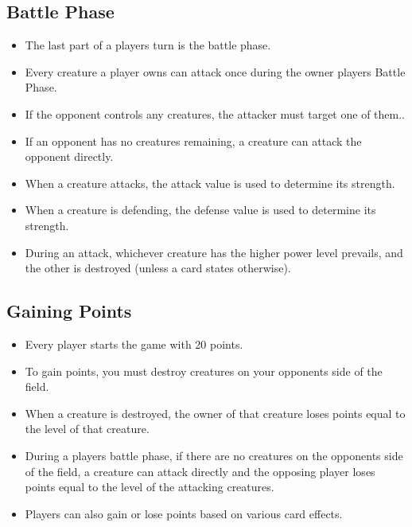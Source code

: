 \subsection{Battle Phase}
\begin{itemize}
    \item The last part of a players turn is the battle phase.
    \item Every creature a player owns can attack once during the owner players Battle Phase.
    \item If the opponent controls any creatures, the attacker must target one of them..
    \item If an opponent has no creatures remaining, a creature can attack the opponent directly.
    \item When a creature attacks, the attack value is used to determine its strength.
    \item When a creature is defending, the defense value is used to determine its strength.
    \item During an attack, whichever creature has the higher power level prevails, and the other is destroyed (unless a card states otherwise).
\end{itemize}








\subsection{Gaining Points}
\begin{itemize}
    \item Every player starts the game with 20 points.
    \item To gain points, you must destroy creatures on your opponents side of the field.
    \item When a creature is destroyed, the owner of that creature loses points equal to the level of that creature.
    \item During a players battle phase, if there are no creatures on the opponents side of the field, a creature can attack directly and the opposing player loses points equal to the level of the attacking creatures.
    \item Players can also gain or lose points based on various card effects.
\end{itemize}








